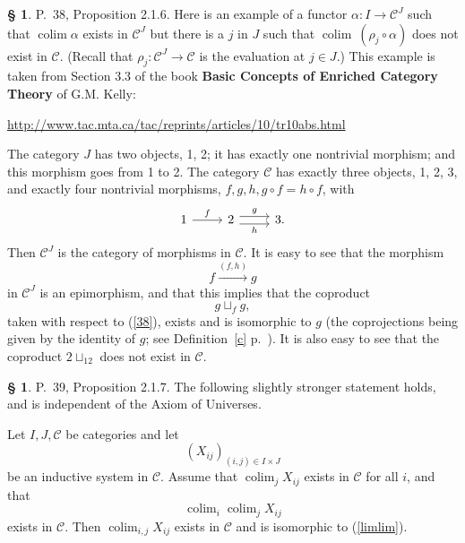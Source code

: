 \documentclass[12pt]{article}%
\theoremstyle{remark}
\theoremstyle{definition}
\newtheorem{s}[thm]{\S}%
\newcommand{\C}{\mathcal C}
\DeclareMathOperator*{\colim}{colim}%
\begin{document}
%

\begin{s}\label{c38}
P.~38, Proposition 2.1.6. Here is an example of a functor $\alpha:I\to\C^J$ such that $\colim\alpha$ exists in $\C^J$ but there is a $j$ in $J$ such that $\colim\ (\rho_j\circ\alpha)$ does not exist in $\C$. (Recall that $\rho_j:\C^J\to\C$ is the evaluation at $j\in J$.) This example is taken from Section 3.3 of the book \textbf{Basic Concepts of Enriched Category Theory} of G.M. Kelly:%
%
\begin{center}\href{http://www.tac.mta.ca/tac/reprints/articles/10/tr10abs.html}{http://www.tac.mta.ca/tac/reprints/articles/10/tr10abs.html}
\end{center}

The category $J$ has two objects, 1, 2; it has exactly one nontrivial morphism; and this morphism goes from 1 to 2. The category $\C$ has exactly three objects, 1, 2, 3, and exactly four nontrivial morphisms, $f,g,h,g\circ f=h\circ f$, with 
$$
\begin{tikzcd}
1\ar{r}{f}&2\ar[yshift=.7ex]{r}{g}\ar[yshift=-.7ex]{r}[swap]{h}&3.
\end{tikzcd}
$$ 
Then $\C^J$ is the category of morphisms in $\C$. It is easy to see that the morphism 
%
\begin{equation}\label{38}
f\xrightarrow{(f,h)}g 
\end{equation}
%
in $\C^J$ is an epimorphism, and that this implies that the coproduct 
$$
g\sqcup_fg,
$$ 
taken with respect to (\ref{38}), exists and is isomorphic to $g$ (the coprojections being given by the identity of $g$; see Definition~\ref{c} p.~\pageref{c}). It is also easy to see that the coproduct $2\sqcup_12$ does not exist in $\C$.
\end{s}

%

\begin{s} 
P.~39, Proposition 2.1.7. The following slightly stronger statement holds, and is independent of the Axiom of Universes. 

Let $I, J, \C$ be categories and let 
$$
(X_{ij})_{(i,j)\in I\times J}
$$ 
be an inductive system in $\C$. Assume that $\colim_jX_{ij}$ exists in $\C$ for all $i$, and that 
\begin{equation}\label{limlim}
\colim_i\colim_jX_{ij}
\end{equation}
exists in $\C$. Then $\colim_{i,j}X_{ij}$ exists in $\C$ and is isomorphic to (\ref{limlim}).
\end{s}
\end{document}
